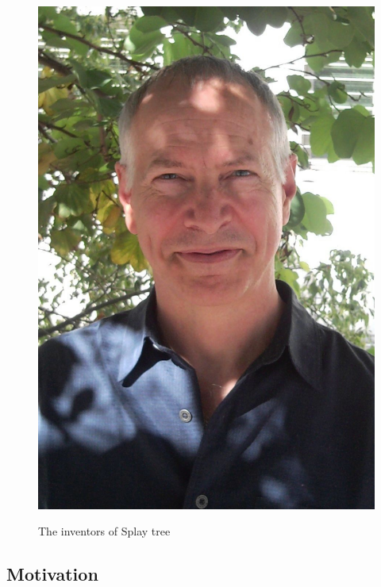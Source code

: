 \documentclass{beamer}
\theoremstyle{plain}
\begin{document}
\begin{frame}
\begin{figure}
{                \includegraphics[height=0.45\textheight]{pics/Robert_Tarjan.jpg}
            }
            \caption{The inventors of Splay tree}
        \end{figure}
    
    \end{frame}

    \subsection{Motivation}
\end{document}
